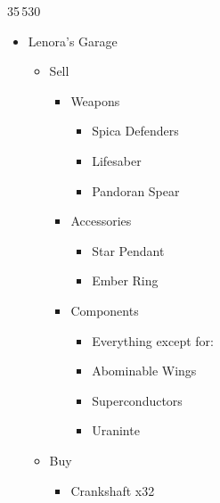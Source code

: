 \renewcommand{\first}{[1] Tide Turner (\syn/\sab)}
\renewcommand{\second}{[2] War and Peace (\com/\med)}
\renewcommand{\third}{[3] Slash \& Burn (\com/\rav)}
\renewcommand{\fourth}{[4] Dualcasting (\rav/\rav)}
\renewcommand{\fifth}{[5] Undermine (\rav/\sab)}
\renewcommand{\sixth}{[6] Divide \& Conquer (\com/\sab)}

\newpage
\begin{multicols}{2}
\begin{shop}{35\,530}
\begin{itemize}
    \item Lenora's Garage
    \begin{itemize}
        \item Sell
        \begin{itemize}
            \item Weapons
            \begin{itemize}
                \item Spica Defenders
                \item Lifesaber
                \item Pandoran Spear
            \end{itemize}
            \item Accessories
            \begin{itemize}
                \item Star Pendant
                \item Ember Ring
            \end{itemize}
            \item Components
            \begin{itemize}
                \item Everything except for:
                \item Abominable Wings
                \item Superconductors
                \item Uraninte
            \end{itemize}
        \end{itemize}
        \item Buy
        \begin{itemize}
            \item Crankshaft x32
        \end{itemize}
    \end{itemize}

\end{itemize}
\end{shop}
\end{multicols}
